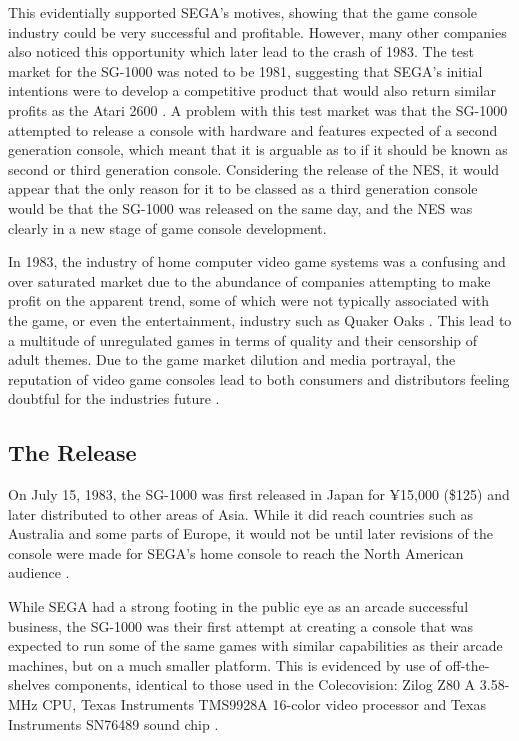 \documentclass{scrartcl}
\begin{document}
This evidentially supported SEGA’s motives, showing that the game console industry could be very successful and profitable. However, many other companies also noticed this opportunity which later lead to the crash of 1983.
The test market for the SG-1000 was noted to be 1981, suggesting that SEGA’s initial intentions were to develop a competitive product that would also return similar profits as the Atari 2600 \cite{SegaRetro}.
A problem with this test market was that the SG-1000 attempted to release a console with hardware and features expected of a second generation console, which meant that it is arguable as to if it should be known as second or third generation console.
Considering the release of the NES, it would appear that the only reason for it to be classed as a third generation console would be that the SG-1000 was released on the same day, and the NES was clearly in a new stage of game console development.

In 1983, the industry of home computer video game systems was a confusing and over saturated market due to the abundance of companies attempting to make profit on the apparent trend, some of which were not typically associated with the game, or even the entertainment, industry such as Quaker Oaks \cite{Wolf2012}. This lead to a multitude of unregulated games in terms of quality and their censorship of adult themes. Due to the game market dilution and media portrayal, the reputation of video game consoles lead to both consumers and distributors feeling doubtful for the industries future \cite{Kent2010Chapter17}.
	
	\subsection{The Release}

On July 15, 1983, the SG-1000 was first released in Japan for ¥15,000 (\$125) and later distributed to other areas of Asia. While it did reach countries such as Australia and some parts of Europe, it would not be until later revisions of the console were made for SEGA’s home console to reach the North American audience \cite{Pettus2013}.

While SEGA had a strong footing in the public eye as an arcade successful business, the SG-1000 was their first attempt at creating a console that was expected to run some of the same games with similar capabilities as their arcade machines, but on a much smaller platform. This is evidenced by use of off-the-shelves components, identical to those used in the Colecovision: Zilog Z80 A 3.58-MHz CPU, Texas Instruments TMS9928A 16-color video processor and Texas Instruments SN76489 sound chip \cite{VideoGameConsoleLibrary}.
\end{document}
